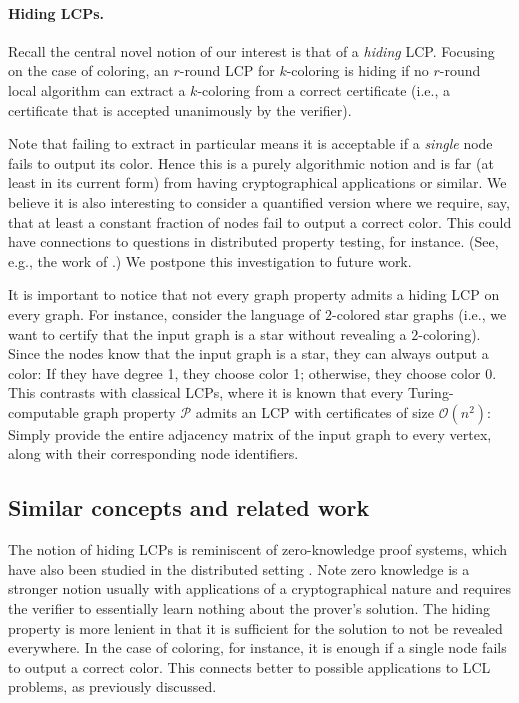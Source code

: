 \documentclass[11pt]{article}
\newcommand*{\cO}{\mathcal{O}}
\begin{document}
\paragraph{Hiding LCPs.}
Recall the central novel notion of our interest is that of a \emph{hiding} LCP.
Focusing on the case of coloring, an $r$-round LCP for $k$-coloring is hiding if
no $r$-round local algorithm can extract a $k$-coloring from a correct
certificate (i.e., a certificate that is accepted unanimously by the verifier).

Note that failing to extract in particular means it is acceptable if a
\emph{single} node fails to output its color.
Hence this is a purely algorithmic notion and is far (at least in its current
form) from having cryptographical applications or similar.
We believe it is also interesting to consider a quantified version where we
require, say, that at least a constant fraction of nodes fail to output a
correct color.
This could have connections to questions in distributed property testing, for
instance.
(See, e.g., the work of \textcite{censor-hillel19_fast_dc}.)
We postpone this investigation to future work.

It is important to notice that not every graph property admits a hiding LCP on every graph. 
For instance, consider the language of $2$-colored star graphs (i.e., we want to
certify that the input graph is a star without revealing a $2$-coloring). 
Since the nodes know that the input graph is a star, they can always output a color: 
If they have degree 1, they choose color 1; otherwise, they choose color 0.
This contrasts with classical LCPs, where it is known that 
every Turing-computable graph property $\mathcal{P}$ admits an LCP with
certificates of size $\cO(n^2)$: 
Simply provide the entire adjacency matrix of the input graph to every vertex, 
along with their corresponding node identifiers.

\subsection{Similar concepts and related work}

The notion of hiding LCPs is reminiscent of zero-knowledge proof systems, which
have also been studied in the distributed setting
\cite{bick22_distributed_soda,grilo25_distributed_arxiv}.
Note zero knowledge is a stronger notion usually with applications of a
cryptographical nature and requires the verifier to essentially learn nothing
about the prover's solution.
The hiding property is more lenient in that it is sufficient for the solution to
not be revealed everywhere.
In the case of coloring, for instance, it is enough if a single node fails to
output a correct color.
This connects better to possible applications to LCL problems, as previously
discussed.
\end{document}
